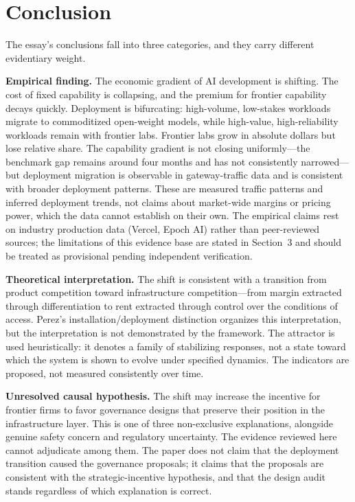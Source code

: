 \section{Conclusion}

The essay's conclusions fall into three categories, and they carry different evidentiary weight.

\textbf{Empirical finding.} The economic gradient of AI development is shifting. The cost of fixed capability is collapsing, and the premium for frontier capability decays quickly. Deployment is bifurcating: high-volume, low-stakes workloads migrate to commoditized open-weight models, while high-value, high-reliability workloads remain with frontier labs. Frontier labs grow in absolute dollars but lose relative share. The capability gradient is not closing uniformly---the benchmark gap remains around four months and has not consistently narrowed---but deployment migration is observable in gateway-traffic data and is consistent with broader deployment patterns. These are measured traffic patterns and inferred deployment trends, not claims about market-wide margins or pricing power, which the data cannot establish on their own. The empirical claims rest on industry production data (Vercel, Epoch AI) rather than peer-reviewed sources; the limitations of this evidence base are stated in Section~3 and should be treated as provisional pending independent verification.

\textbf{Theoretical interpretation.} The shift is consistent with a transition from product competition toward infrastructure competition---from margin extracted through differentiation to rent extracted through control over the conditions of access. Perez's installation/deployment distinction organizes this interpretation, but the interpretation is not demonstrated by the framework. The attractor is used heuristically: it denotes a family of stabilizing responses, not a state toward which the system is shown to evolve under specified dynamics. The indicators are proposed, not measured consistently over time.

\textbf{Unresolved causal hypothesis.} The shift may increase the incentive for frontier firms to favor governance designs that preserve their position in the infrastructure layer. This is one of three non-exclusive explanations, alongside genuine safety concern and regulatory uncertainty. The evidence reviewed here cannot adjudicate among them. The paper does not claim that the deployment transition caused the governance proposals; it claims that the proposals are consistent with the strategic-incentive hypothesis, and that the design audit stands regardless of which explanation is correct.

